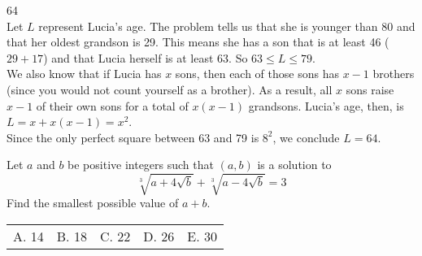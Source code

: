 \documentclass[12pt]{article}
\makeatletter
\newcounter{problem}
\newcommand{\multChoice}[5]{
    \begin{tabular}{l @{\hskip 1.5cm} l @{\hskip 1.5cm} l @{\hskip 1.5cm} l @{\hskip 1.5cm} l}
    A. #1 & B. #2 & C. #3 & D. #4 & E. #5
\end{tabular}

}
\makeatother
\begin{document}
\begin{solution}
   64 \\
   Let $L$ represent Lucia's age. The problem tells us that she is younger than 80 and that her oldest grandson is 29. This means she has a son that is at least 46 ($29+17$) and that Lucia herself is at least 63. So $63 \leq L \leq 79$. \\[5pt]
   We also know that if Lucia has $x$ sons, then each of those sons has $x-1$ brothers (since you would not count yourself as a brother). As a result, all $x$ sons raise $x-1$ of their own sons for a total of $x(x-1)$ grandsons. Lucia's age, then, is $L = x + x(x-1) = x^2$. \\[5pt]
   Since the only perfect square between 63 and 79 is $8^2$, we conclude $L=\boxed{64}$.
\end{solution}

\vskip 1cm

\begin{problem}
   Let $a$ and $b$ be positive integers such that $(a,b)$ is a solution to
   $$\sqrt[3]{a+4\sqrt{b}} + \sqrt[3]{a-4\sqrt{b}} = 3$$
   Find the smallest possible value of $a+b$.
   \multChoice{14}{18}{22}{26}{30}
\end{problem}

\vskip 0.5cm
\end{document}
